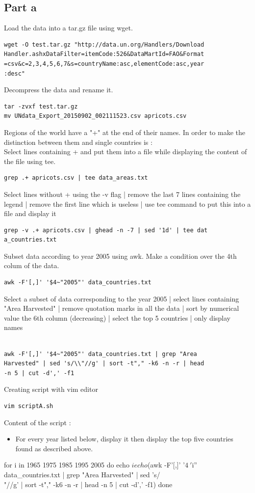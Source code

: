\documentclass{llncs}\usepackage[]{graphicx}\usepackage[]{color}
\begin{document}
\subsection{Part a}
Load the data into a tar.gz file using wget.
\begin{lstlisting}[frame=single] 
wget -O test.tar.gz "http://data.un.org/Handlers/Download
Handler.ashxDataFilter=itemCode:526&DataMartId=FAO&Format
=csv&c=2,3,4,5,6,7&s=countryName:asc,elementCode:asc,year
:desc" 
\end{lstlisting}
Decompress the data and rename it.
\begin{lstlisting}[frame=single] 
tar -zvxf test.tar.gz 
mv UNdata_Export_20150902_002111523.csv apricots.csv
\end{lstlisting}
Regions of the world have a "+" at the end of their names. In order to make the distinction between them and single countries is : \\ 
Select lines containing + and put them into a file while displaying the content of the file using tee. 
\begin{lstlisting}[frame=single] 
grep .+ apricots.csv | tee data_areas.txt
\end{lstlisting}
Select lines without + using the -v flag | remove the last 7 lines containing the legend | remove the first line which is useless | use tee command to put this into a file and display it
\begin{lstlisting}[frame=single] 
grep -v .+ apricots.csv | ghead -n -7 | sed '1d' | tee dat
a_countries.txt
\end{lstlisting}
Subset data according to year 2005 using awk. Make a condition over the 4th colum of the data.
\begin{lstlisting}[frame=single] 
awk -F'[,]' '$4~"2005"' data_countries.txt
\end{lstlisting}
Select a subset of data corresponding to the year 2005 | select lines containing "Area Harvested" | remove quotation marks in all the data | sort by numerical value the 6th column (decreasing) | select the top 5 countries | only display names 
\begin{lstlisting}[frame=single]  % Start your code-block

awk -F'[,]' '$4~"2005"' data_countries.txt | grep "Area 
Harvested" | sed 's/\\"//g' | sort -t"," -k6 -n -r | head 
-n 5 | cut -d',' -f1
\end{lstlisting}
Creating script with vim editor
\begin{lstlisting}[frame=single] 
vim scriptA.sh
\end{lstlisting}
Content of the script :
\begin{itemize}
\item For every year listed below, display it then display the top five countries found as described above.
\end{itemize}
\begin{boxedverbatim}
for i in 1965 1975 1985 1995 2005
do
        echo $i
        echo $(awk -F'[,]' '$4~'$i'' data_countries.txt |
		grep "Area Harvested" | sed 's/\\"//g' | sort -t"," -k6 
-n -r | head -n 5 | cut -d',' -f1)
done 
\end{boxedverbatim}
\end{document}
